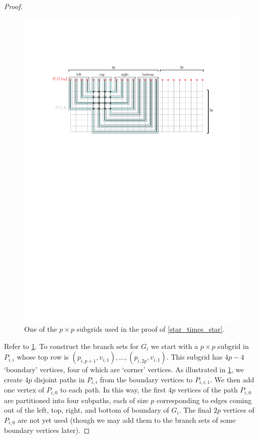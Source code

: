 \documentclass{patmorin}
\theoremstyle{plain}
\theoremstyle{definition}
\begin{document}
\begin{proof}
  \begin{figure}[H]
    \begin{center}
      \includegraphics[width=\textwidth]{subgrid}
    \end{center}
    \caption{One of the $p\times p$ subgrids used in the proof of \cref{star_times_star}.}
    \label{subgrid}
  \end{figure}

  Refer to \cref{subgrid}. To construct the branch sets for $G_i$ we start with a $p\times p$ subgrid in $P_{i,i}$ whose top row is $(p_{i,p+1},v_{i,1}),\ldots,(p_{i,2p},v_{i,1})$.  This subgrid has $4p-4$ `boundary' vertices, four of which are `corner' vertices. As illustrated in \cref{subgrid}, we create $4p$ disjoint paths in $P_{i,i}$ from the boundary vertices to $P_{i,i,1}$.  We then add one vertex of $P_{i,0}$ to each path.  In this way, the first $4p$ vertices of the path $P_{i,0}$ are partitioned into four subpaths, each of size $p$ corresponding to edges coming out of the left, top, right, and bottom of boundary of $G_i$.  The final $2p$ vertices of $P_{i,0}$ are not yet used (though we may add them to the branch sets of some boundary vertices later).



\end{proof}
\end{document}
